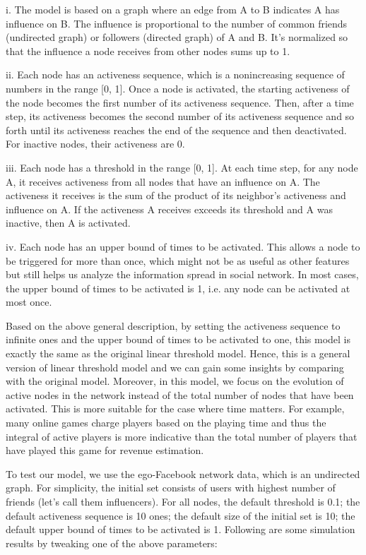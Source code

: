 \documentclass{article}
\begin{document}
i. The model is based on a graph where an edge from A to B indicates A has influence on B. The influence is proportional to the number of common friends (undirected graph) or followers (directed graph) of A and B. It’s normalized so that the influence a node receives from other nodes sums up to 1.

ii. Each node has an activeness sequence, which is a nonincreasing sequence of numbers in the range [0, 1]. Once a node is activated, the starting activeness of the node becomes the first number of its activeness sequence. Then, after a time step, its activeness becomes the second number of its activeness sequence and so forth until its activeness reaches the end of the sequence and then deactivated. For inactive nodes, their activeness are 0.

iii. Each node has a threshold in the range [0, 1].  At each time step, for any node A, it receives activeness from all nodes that have an influence on A. The activeness it receives is the sum of the product of its neighbor’s activeness and influence on A. If the activeness A receives exceeds its threshold and A was inactive, then A is activated.

iv. Each node has an upper bound of times to be activated. This allows a node to be triggered for more than once, which might not be as useful as other features but still helps us analyze the information spread in social network. In most cases, the upper bound of times to be activated is 1, i.e. any node can be activated at most once.

Based on the above general description, by setting the activeness sequence to infinite ones and the upper bound of times to be activated to one, this model is exactly the same as the original linear threshold model. Hence, this is a general version of linear threshold model and we can gain some insights by comparing with the original model. Moreover, in this model, we focus on the evolution of active nodes in the network instead of the total number of nodes that have been activated. This is more suitable for the case where time matters. For example, many online games charge players based on the playing time and thus the integral of active players is more indicative than the total number of players that have played this game for revenue estimation.

To test our model, we use the ego-Facebook network data, which is an undirected graph. For simplicity, the initial set consists of users with highest number of friends (let’s call them influencers). For all nodes, the default threshold is 0.1; the default activeness sequence is 10 ones; the default size of the initial set is 10; the default upper bound of times to be activated is 1. Following are some simulation results by tweaking one of the above parameters:
\end{document}
